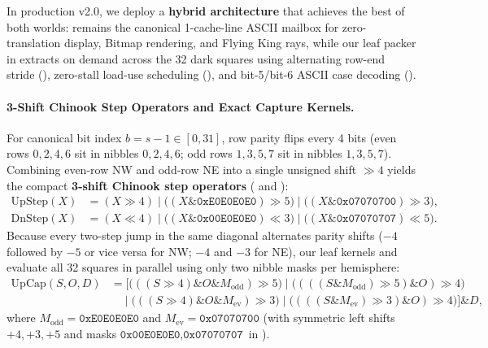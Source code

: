 In production v2.0, we deploy a \textbf{hybrid architecture} that achieves the best of both worlds:  remains the canonical 1-cache-line ASCII mailbox for zero-translation  display, Bitmap rendering, and Flying King rays, while our leaf packer  in  extracts  on demand across the 32 dark squares using alternating row-end stride (), zero-stall load-use scheduling (), and bit-5/bit-6 ASCII case decoding ().

\paragraph{3-Shift Chinook Step Operators and Exact Capture Kernels.}
For canonical bit index $b = s - 1 \in [0, 31]$, row parity flips every 4 bits (even rows $0,2,4,6$ sit in nibbles $0,2,4,6$; odd rows $1,3,5,7$ sit in nibbles $1,3,5,7$). Combining even-row NW and odd-row NE into a single unsigned shift $\gg 4$ yields the compact \textbf{3-shift Chinook step operators} ( and ):
\begin{align}
    \mathrm{UpStep}(X) &= (X \gg 4) \mid \big((X \mathbin{\&} \texttt{0xE0E0E0E0}) \gg 5\big) \mid \big((X \mathbin{\&} \texttt{0x07070700}) \gg 3\big), \label{eq:swar_upstep}\\
    \mathrm{DnStep}(X) &= (X \ll 4) \mid \big((X \mathbin{\&} \texttt{0x00E0E0E0}) \ll 3\big) \mid \big((X \mathbin{\&} \texttt{0x07070707}) \ll 5\big). \label{eq:swar_dnstep}
\end{align}
Because every two-step jump in the same diagonal alternates parity shifts ($-4$ followed by $-5$ or vice versa for NW; $-4$ and $-3$ for NE), our leaf kernels  and  evaluate all 32 squares in parallel using only two nibble masks per hemisphere:
\begin{align}
    \mathrm{UpCap}(S, O, D) &= \Big[
        \big(((S \gg 4) \mathbin{\&} O \mathbin{\&} M_{\text{odd}}) \gg 5\big)
        \mid \big((((S \mathbin{\&} M_{\text{odd}}) \gg 5) \mathbin{\&} O) \gg 4\big) \nonumber\\
    &\quad \mid \big(((S \gg 4) \mathbin{\&} O \mathbin{\&} M_{\text{ev}}) \gg 3\big)
        \mid \big((((S \mathbin{\&} M_{\text{ev}}) \gg 3) \mathbin{\&} O) \gg 4\big)
    \Big] \mathbin{\&} D, \label{eq:swar_upcap}
\end{align}
where $M_{\text{odd}} = \texttt{0xE0E0E0E0}$ and $M_{\text{ev}} = \texttt{0x07070700}$ (with symmetric left shifts $+4, +3, +5$ and masks $\texttt{0x00E0E0E0}, \texttt{0x07070707}$ in ).

